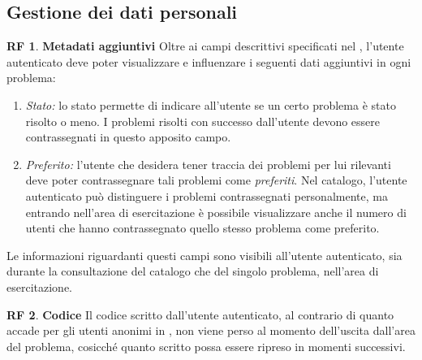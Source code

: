 \documentclass[11pt, a4paper]{article}
\theoremstyle{definition}
\newtheorem{funcreq}{RF} %
\begin{document}
\subsection{Gestione dei dati personali}\label{gestprofilo}

\begin{funcreq}
    \textbf{Metadati aggiuntivi }
    Oltre ai campi descrittivi specificati nel \textcolor{blue}{},
    l'utente autenticato deve poter visualizzare e influenzare i seguenti dati aggiuntivi in
    ogni problema:
    \begin{enumerate}
        \item \textit{Stato:} lo stato permette di indicare all'utente se un certo problema
        è stato risolto o meno. I problemi risolti con successo dall'utente devono essere
        contrassegnati in questo apposito campo.

        \item \textit{Preferito:} l'utente che desidera tener traccia dei problemi
        per lui rilevanti deve poter contrassegnare tali problemi come \textit{preferiti}.
        Nel catalogo, l'utente autenticato può distinguere i problemi contrassegnati
        personalmente, ma entrando nell'area di esercitazione è possibile visualizzare
        anche il numero di utenti che hanno contrassegnato quello stesso problema come
        preferito.
    \end{enumerate}
    Le informazioni riguardanti questi campi sono visibili all'utente autenticato,
    sia durante la consultazione del catalogo che del singolo problema, nell'area di
    esercitazione.
\end{funcreq}

\begin{funcreq}
\label{code}
\textbf{Codice } Il codice scritto dall'utente autenticato, al contrario di
quanto accade per gli utenti anonimi in
\textcolor{blue}{},
non viene perso al momento dell'uscita dall'area del problema, cosicché
quanto scritto possa essere ripreso in momenti successivi.
\end{funcreq}
\end{document}
